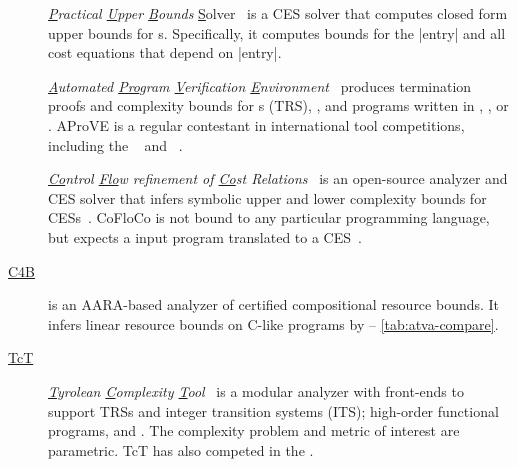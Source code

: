 \begin{description}

\item[\href{https://costa.fdi.ucm.es/~costa/pubs/pubs.php}{}]
      \emph{\underline{P}ractical \underline{U}pper \underline{B}ounds}
      \underline{S}olver~\cite{albert2010}
      is a CES solver that computes closed form upper bounds for s. Specifically, it computes bounds for the \pr|entry| and
      all cost equations that depend on \pr|entry|.

\item[\href{https://aprove.informatik.rwth-aachen.de}{}]
      \emph{\underline{A}utomated \underline{Pro}gram \underline{V}erification
      \underline{E}nvironment}~\cite{giesl2016} produces termination proofs and
      complexity bounds for s (TRS), , and programs written in , ,
      or .
      AProVE is a regular contestant in international tool competitions,
      including the
      \href{https://termination-portal.org/wiki/Termination_Competition}%
      {}~\cite{giesl2019}
      and \href{https://sv-comp.sosy-lab.org}%
      {}~\cite{beyer2022}.

\item[\href{https://github.com/aeflores/CoFloCo}{}]
      \emph{\underline{Co}ntrol \underline{Flo}w refinement of \underline{Co}st
      Relations}~\cite{floresmontoya2014}
      is an open-source analyzer and CES solver that infers symbolic upper and
      lower complexity bounds for CESs~\cite{flores-montoya2016}.
      CoFloCo is not bound to any particular programming language, but expects a
      input program translated to a CES~\cite{flores2016}.

\item[\href{https://github.com/academic-archive/pldi15}{C4B}]\cite{carbonneaux2015}
      is an AARA-based analyzer of certified compositional resource bounds. It
      infers linear resource bounds on C-like programs by  --
      \autoref{tab:atva-compare}.

\item[\href{http://cl-informatik.uibk.ac.at/software/tct/}{TcT}]
       \emph{\underline{T}yrolean \underline{C}omplexity \underline{T}ool}~\cite{avanzini2016}
       is a modular analyzer with front-ends to support TRSs and integer transition systems (ITS);
       high-order functional programs, and .
       The complexity problem and metric of interest are parametric.
       TcT has also competed in the .


\end{description}
